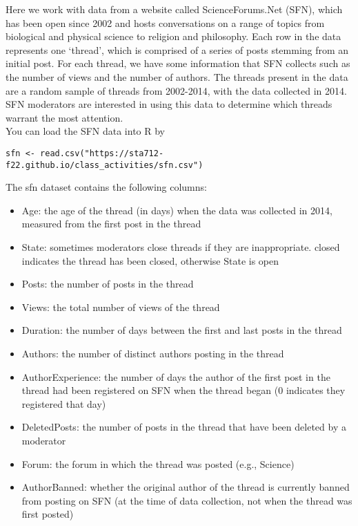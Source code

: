 \documentclass[11pt]{article}
\begin{document}
Here we work with data from a website called ScienceForums.Net (SFN), which has been open since 2002 and hosts conversations on a range of topics from biological and physical science to religion and philosophy. Each row in the data represents one ‘thread’, which is comprised of a series of posts stemming from an initial post. For each thread, we have some information that SFN collects such as the number of views and the number of authors. The threads present in the data are a random sample of threads from 2002-2014, with the data collected in 2014. SFN moderators are interested in using this data to determine which threads warrant the most attention.\\

\noindent You can load the SFN data into R by

\begin{verbatim}
sfn <- read.csv("https://sta712-f22.github.io/class_activities/sfn.csv")
\end{verbatim}

\noindent The sfn dataset contains the following columns:

\begin{itemize}
\item Age: the age of the thread (in days) when the data was collected in 2014, measured from the first post in the thread
\item State: sometimes moderators close threads if they are inappropriate. closed indicates the thread has been closed, otherwise State is open
\item Posts: the number of posts in the thread
\item Views: the total number of views of the thread
\item Duration: the number of days between the first and last posts in the thread
\item Authors: the number of distinct authors posting in the thread
\item AuthorExperience: the number of days the author of the first post in the thread had been registered on SFN when the thread began (0 indicates they registered that day)
\item DeletedPosts: the number of posts in the thread that have been deleted by a moderator
\item Forum: the forum in which the thread was posted (e.g., Science)
\item AuthorBanned: whether the original author of the thread is currently banned from posting on SFN (at the time of data collection, not when the thread was first posted)
\end{itemize}
\end{document}
